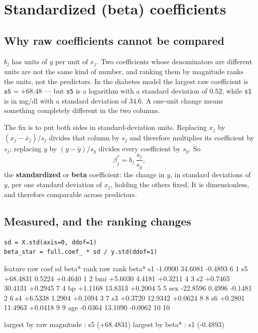 \documentclass[11pt]{article}
\begin{document}
\notesources{\AMLUnitVSources}

\section{Standardized (beta) coefficients}
\label{sec:std}

\subsection{Why raw coefficients cannot be compared}

$b_j$ has units of $y$ per unit of $x_j$. Two coefficients whose denominators
are different units are not the same kind of number, and ranking them by
magnitude ranks the units, not the predictors. In the diabetes model the
largest raw coefficient is $\texttt{s5} = +68.48$ --- but \texttt{s5} is a
logarithm with a standard deviation of $0.52$, while \texttt{s1} is in mg/dl
with a standard deviation of $34.6$. A one-unit change means something
completely different in the two columns.

The fix is to put both sides in standard-deviation units. Replacing $x_j$ by
$(x_j - \bar x_j)/s_j$ divides that column by $s_j$ and therefore multiplies
its coefficient by $s_j$; replacing $y$ by $(y-\bar y)/s_y$ divides every
coefficient by $s_y$. So
\begin{equation}
  \label{eq:betastar}
  \beta^*_j = b_j\,\frac{s_j}{s_y} ,
\end{equation}
the \textbf{standardized} or \textbf{beta} coefficient: the change in $y$, in
standard deviations of $y$, per one standard deviation of $x_j$, holding the
others fixed. It is dimensionless, and therefore comparable across predictors.

\subsection{Measured, and the ranking changes}

\begin{lstlisting}
sd = X.std(axis=0, ddof=1)
beta_star = full.coef_ * sd / y.std(ddof=1)
\end{lstlisting}
\begin{codeout}
feature    raw coef        sd      beta*   rank raw   rank beta*
s1           -1.0900   34.6081    -0.4893        6            1
s5          +68.4831    0.5224    +0.4640        1            2
bmi          +5.6030    4.4181    +0.3211        4            3
s2           +0.7465   30.4131    +0.2945        7            4
bp           +1.1168   13.8313    +0.2004        5            5
sex         -22.8596    0.4996    -0.1481        2            6
s4           +6.5338    1.2904    +0.1094        3            7
s3           +0.3720   12.9342    +0.0624        8            8
s6           +0.2801   11.4963    +0.0418        9            9
age          -0.0364   13.1090    -0.0062       10           10

largest by raw magnitude  : s5 (+68.4831)
largest by beta*          : s1 (-0.4893)
\end{codeout}
\end{document}
